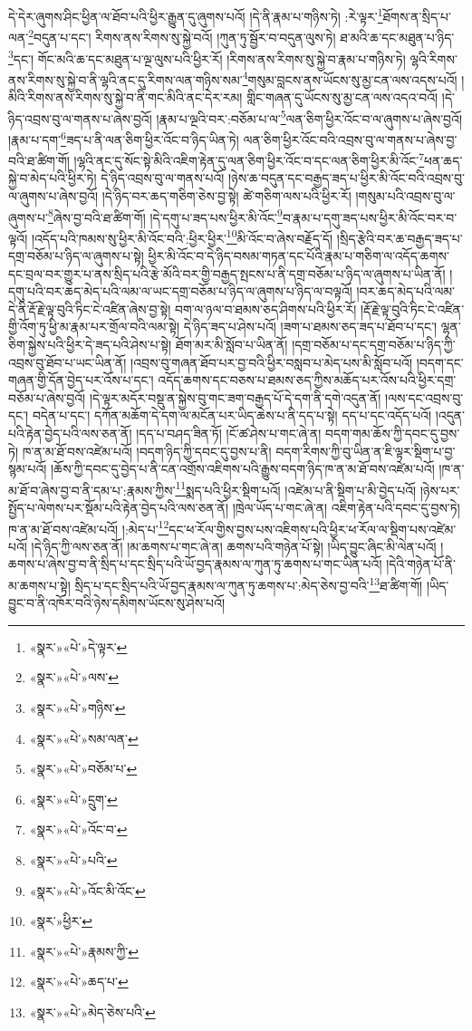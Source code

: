 དེ་དེར་ཞུགས་ཤིང་ཕྱིན་ལ་ཐོབ་པའི་ཕྱིར་རྒྱུན་དུ་ཞུགས་པའོ། །དེ་ནི་རྣམ་པ་གཉིས་ཏེ། :རེ་ལྟར་\footnote{«སྣར་»«པེ་»དེ་ལྟར་}ཐོགས་ན་སྲིད་པ་ལན་\footnote{«སྣར་»«པེ་»ལས་}བདུན་པ་དང་། རིགས་ནས་རིགས་སུ་སྐྱེ་བའོ། །ཀུན་ཏུ་སྦྱོར་བ་བདུན་ལུས་ཏེ། ཐ་མའི་ཆ་དང་མཐུན་པ་ཉིད་\footnote{«སྣར་»«པེ་»གཉིས་}དང་། གོང་མའི་ཆ་དང་མཐུན་པ་ལྔ་ལུས་པའི་ཕྱིར་རོ། །རིགས་ནས་རིགས་སུ་སྐྱེ་བ་རྣམ་པ་གཉིས་ཏེ། ལྷའི་རིགས་ནས་རིགས་སུ་སྐྱེ་བ་ནི་ལྷའི་ནང་དུ་རིགས་ལན་གཉིས་སམ་\footnote{«སྣར་»«པེ་»སམ་ལན་}གསུམ་བླངས་ནས་ཡོངས་སུ་མྱ་ངན་ལས་འདས་པའོ། །མིའི་རིགས་ནས་རིགས་སུ་སྐྱེ་བ་ནི་གང་མིའི་ནང་དེར་རམ། གླིང་གཞན་དུ་ཡོངས་སུ་མྱ་ངན་ལས་འདའ་བའོ། །དེ་ཉིད་འབྲས་བུ་ལ་གནས་པ་ཞེས་བྱའོ། །རྣམ་པ་ལྔའི་བར་:བཅོམ་པ་ལ་\footnote{«སྣར་»«པེ་»བཅོམ་པ་}ལན་ཅིག་ཕྱིར་འོང་བ་ལ་ཞུགས་པ་ཞེས་བྱའོ། །རྣམ་པ་དག་\footnote{«སྣར་»«པེ་»དྲུག་}ཟད་པ་ནི་ལན་ཅིག་ཕྱིར་འོང་བ་ཉིད་ཡིན་ཏེ། ལན་ཅིག་ཕྱིར་འོང་བའི་འབྲས་བུ་ལ་གནས་པ་ཞེས་བྱ་བའི་ཐ་ཚིག་གོ། །ལྷའི་ནང་དུ་སོང་སྟེ་མིའི་འཇིག་རྟེན་དུ་ལན་ཅིག་ཕྱིར་འོང་བ་དང་ལན་ཅིག་ཕྱིར་མི་འོང་\footnote{«སྣར་»«པེ་»འོང་བ་}ཕན་ཆད་སྐྱེ་བ་མེད་པའི་ཕྱིར་ཏེ། དེ་ཉིད་འབྲས་བུ་ལ་གནས་པའོ། །ཉེས་ཆ་བདུན་དང་བརྒྱད་ཟད་པ་ཕྱིར་མི་འོང་བའི་འབྲས་བུ་ལ་ཞུགས་པ་ཞེས་བྱའོ། །དེ་ཉིད་བར་ཆད་གཅིག་ཅེས་བྱ་སྟེ། ཚེ་གཅིག་ལས་པའི་ཕྱིར་རོ། །གསུམ་པའི་འབྲས་བུ་ལ་ཞུགས་པ་\footnote{«སྣར་»«པེ་»པའི་}ཞེས་བྱ་བའི་ཐ་ཚིག་གོ། །དེ་དགུ་པ་ཟད་པས་ཕྱིར་མི་འོང་\footnote{«སྣར་»«པེ་»འོང་མི་འོང་}བ་རྣམ་པ་དགུ་ཟད་པས་ཕྱིར་མི་འོང་བར་བ་ལྟའོ། །འདོད་པའི་ཁམས་སུ་ཕྱིར་མི་འོང་བའི་:ཕྱིར་ཕྱིར་\footnote{«སྣར་»ཕྱིར་}མི་འོང་བ་ཞེས་བརྗོད་དོ། །སྲིད་རྩེའི་བར་ཆ་བརྒྱད་ཟད་པ་དགྲ་བཅོམ་པ་ཉིད་ལ་ཞུགས་པ་སྟེ། ཕྱིར་མི་འོང་བ་དེ་ཉིད་བསམ་གཏན་དང་པོའི་རྣམ་པ་གཅིག་ལ་འདོད་ཆགས་དང་བྲལ་བར་གྱུར་པ་ནས་སྲིད་པའི་རྩེ་མོའི་བར་གྱི་བརྒྱད་སྤངས་པ་ནི་དགྲ་བཅོམ་པ་ཉིད་ལ་ཞུགས་པ་ཡིན་ནོ། །དགུ་པའི་བར་ཆད་མེད་པའི་ལམ་ལ་ཡང་དགྲ་བཅོམ་པ་ཉིད་ལ་ཞུགས་པ་ཉིད་ལ་བལྟའོ། །བར་ཆད་མེད་པའི་ལམ་དེ་ནི་རྡོ་རྗེ་ལྟ་བུའི་ཏིང་ངེ་འཛིན་ཞེས་བྱ་སྟེ། བག་ལ་ཉལ་བ་ཐམས་ཅད་ཤིགས་པའི་ཕྱིར་རོ། །རྡོ་རྗེ་ལྟ་བུའི་ཏིང་ངེ་འཛིན་གྱི་འོག་ཏུ་ཕྱི་མ་རྣམ་པར་གྲོལ་བའི་ལམ་སྟེ། དེ་ཉིད་ཟད་པ་ཤེས་པའོ། །ཟག་པ་ཐམས་ཅད་ཟད་པ་ཐོབ་པ་དང་། ལྷན་ཅིག་སྐྱེས་པའི་ཕྱིར་དེ་ཟད་པའི་ཤེས་པ་སྟེ། ཐོག་མར་མི་སློབ་པ་ཡིན་ནོ། །དགྲ་བཅོམ་པ་དང་དགྲ་བཅོམ་པ་ཉིད་ཀྱི་འབྲས་བུ་ཐོབ་པ་ཡང་ཡིན་ནོ། །འབྲས་བུ་གཞན་ཐོབ་པར་བྱ་བའི་ཕྱིར་བསླབ་པ་མེད་པས་མི་སློབ་པའོ། །བདག་དང་གཞན་གྱི་དོན་བྱེད་པར་འོས་པ་དང་། འདོད་ཆགས་དང་བཅས་པ་ཐམས་ཅད་ཀྱིས་མཆོད་པར་འོས་པའི་ཕྱིར་དགྲ་བཅོམ་པ་ཞེས་བྱའོ། །དེ་ལྟར་མདོར་བསྡུ་ན་སྐྱེས་བུ་གང་ཟག་བརྒྱད་པོ་དེ་དག་ནི་དགེ་འདུན་ནོ། །ལས་དང་འབྲས་བུ་དང་། བདེན་པ་དང་། དཀོན་མཆོག་དེ་དག་ལ་མངོན་པར་ཡིད་ཆེས་པ་ནི་དད་པ་སྟེ། དད་པ་དང་འདོད་པའོ། །འདུན་པའི་རྟེན་བྱེད་པའི་ལས་ཅན་ནོ། །དད་པ་བཤད་ཟིན་ཏོ། །ངོ་ཚ་ཤེས་པ་གང་ཞེ་ན། བདག་གམ་ཆོས་ཀྱི་དབང་དུ་བྱས་ཏེ། ཁ་ན་མ་ཐོ་བས་འཛེམ་པའོ། །བདག་ཉིད་ཀྱི་དབང་དུ་བྱས་པ་ནི། བདག་རིགས་ཀྱི་བུ་ཡིན་ན་ཇི་ལྟར་སྡིག་པ་བྱ་སྙམ་པའོ། །ཆོས་ཀྱི་དབང་དུ་བྱེད་པ་ནི་ངན་འགྲོས་འཇིགས་པའི་རྒྱུས་བདག་ཉིད་ཁ་ན་མ་ཐོ་བས་འཛེམ་པའོ། །ཁ་ན་མ་ཐོ་བ་ཞེས་བྱ་བ་ནི་དམ་པ་:རྣམས་ཀྱིས་\footnote{«སྣར་»«པེ་»རྣམས་ཀྱི་}སྨད་པའི་ཕྱིར་སྡིག་པའོ། །འཛེམ་པ་ནི་སྡིག་པ་མི་བྱེད་པའོ། །ཉེས་པར་སྤྱོད་པ་ལེགས་པར་སྡོམ་པའི་རྟེན་བྱེད་པའི་ལས་ཅན་ནོ། །ཁྲེལ་ཡོད་པ་གང་ཞེ་ན། འཇིག་རྟེན་པའི་དབང་དུ་བྱས་ཏེ། ཁ་ན་མ་ཐོ་བས་འཛེམ་པའོ། །:མེད་པ་\footnote{«སྣར་»«པེ་»ཆད་པ་}དང་ཕ་རོལ་གྱིས་བྱས་པས་འཇིགས་པའི་ཕྱིར་ཕ་རོལ་ལ་སྡིག་པས་འཛེམ་པའོ། །དེ་ཉིད་ཀྱི་ལས་ཅན་ནོ། །མ་ཆགས་པ་གང་ཞེ་ན། ཆགས་པའི་གཉེན་པོ་སྟེ། །ཡིད་བྱུང་ཞིང་མི་ལེན་པའོ། །ཆགས་པ་ཞེས་བྱ་བ་ནི་སྲིད་པ་དང་སྲིད་པའི་ཡོ་བྱད་རྣམས་ལ་ཀུན་ཏུ་ཆགས་པ་གང་ཡིན་པའོ། །དེའི་གཉེན་པོ་ནི་མ་ཆགས་པ་སྟེ། སྲིད་པ་དང་སྲིད་པའི་ཡོ་བྱད་རྣམས་ལ་ཀུན་ཏུ་ཆགས་པ་:མེད་ཅེས་བྱ་བའི་\footnote{«སྣར་»«པེ་»མེད་ཅེས་པའི་}ཐ་ཚིག་གོ། །ཡིད་བྱུང་བ་ནི་འཁོར་བའི་ཉེས་དམིགས་ཡོངས་སུ་ཤེས་པའོ། 